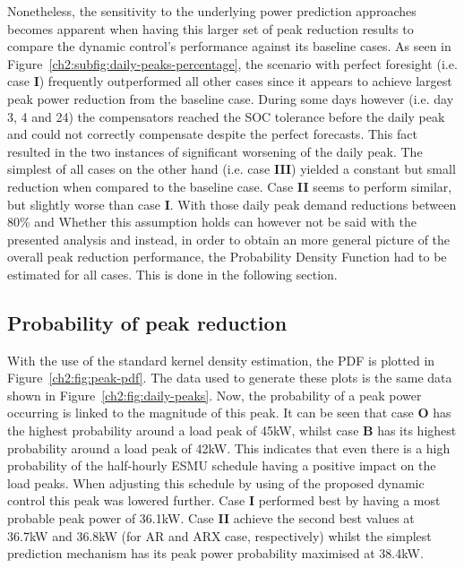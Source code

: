 Nonetheless, the sensitivity to the underlying power prediction approaches becomes apparent when having this larger set of peak reduction results to compare the dynamic control's performance against its baseline cases.
As seen in Figure~\ref{ch2:subfig:daily-peaks-percentage}, the scenario with perfect foresight (i.e. case \textbf{I}) frequently outperformed all other cases since it appears to achieve largest peak power reduction from the baseline case.
During some days however (i.e. day 3, 4 and 24) the compensators reached the SOC tolerance before the daily peak and could not correctly compensate despite the perfect forecasts.
This fact resulted in the two instances of significant worsening of the daily peak.
The simplest of all cases on the other hand (i.e. case \textbf{III}) yielded a constant but small reduction when compared to the baseline case.
Case \textbf{II} seems to perform similar, but slightly worse than case \textbf{I}.
With those daily peak demand reductions between 80\% and 
Whether this assumption holds can however not be said with the presented analysis and instead, in order to obtain an more general picture of the overall peak reduction performance, the Probability Density Function had to be estimated for all cases.
This is done in the following section.

\subsection{Probability of peak reduction}
\label{ch2:subsec:probability-of-peak-reduction}



With the use of the standard kernel density estimation, the PDF is plotted in Figure~\ref{ch2:fig:peak-pdf}.
The data used to generate these plots is the same data shown in Figure~\ref{ch2:fig:daily-peaks}.
Now, the probability of a peak power occurring is linked to the magnitude of this peak.
It can be seen that case \textbf{O} has the highest probability around a load peak of 45kW, whilst case \textbf{B} has its highest probability around a load peak of 42kW.
This indicates that even there is a high probability of the half-hourly ESMU schedule having a positive impact on the load peaks.
When adjusting this schedule by using of the proposed dynamic control this peak was lowered further.
Case \textbf{I} performed best by having a most probable peak power of 36.1kW.
Case \textbf{II} achieve the second best values at 36.7kW and 36.8kW (for AR and ARX case, respectively) whilst the simplest prediction mechanism has its peak power probability maximised at 38.4kW.

